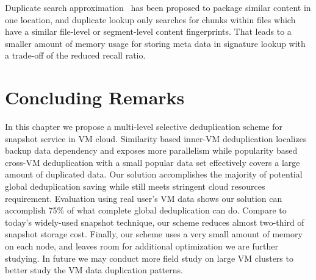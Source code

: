 Duplicate  search approximation~\cite{extreme_binning09,sparseindex09,Xia2011}  has been proposed 
to package similar content in one location, and duplicate lookup  only searches
for chunks within files which have a similar file-level or segment-level  content fingerprints.
That leads  to a smaller amount of memory usage for storing meta data in signature
lookup with a trade-off of the reduced recall ratio.

\section{Concluding Remarks}
\label{inline:concl}
In this chapter we propose a multi-level selective deduplication scheme for 
snapshot service in VM cloud. 
Similarity based inner-VM deduplication localizes backup data dependency and exposes more parallelism  
while popularity based cross-VM deduplication with a small popular data set
effectively  covers a large amount of duplicated data.
Our solution accomplishes the majority of
potential global deduplication saving while still meets stringent cloud resources requirement. 
Evaluation using real user's VM data shows
our solution can accomplish 75\% of what complete global
deduplication can do. 
Compare to today's widely-used snapshot technique, our scheme reduces almost
two-third of snapshot storage cost.
Finally, our scheme uses a very small amount of memory on each node, and leaves
room for additional optimization we are further studying.
In future we may conduct more field study on large VM clusters to better study the 
VM data duplication patterns.